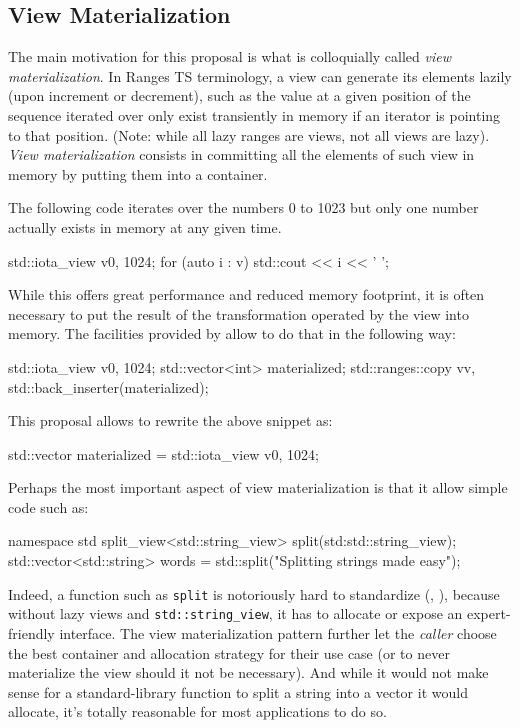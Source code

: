 \documentclass{wg21}
\newcommand{\cc}[1]{\texttt{#1}}
\begin{document}
\subsection{View Materialization}

The main motivation for this proposal is what is colloquially called \emph{view materialization}.
In Ranges TS terminology, a view can generate its elements lazily (upon increment or decrement), such as the value at a given position of the sequence
iterated over only exist transiently in memory if an iterator is pointing to that position.
(Note: while all lazy ranges are views, not all views are lazy).\\

\emph{View materialization} consists in committing all the elements of such view in memory by putting them into a container.

The following code iterates over the numbers 0 to 1023 but only one number actually exists in memory at any given time. 
\begin{codeblock}
std::iota_view v{0, 1024};
for (auto i : v) {
	std::cout << i << ' ';
}
\end{codeblock}

While this offers great performance and reduced memory footprint, it is often necessary to put the result of the transformation operated by the view into memory.
The facilities provided by \cite{P0896R3} allow to do that in the following way:


\begin{codeblock}
	std::iota_view v{0, 1024};
	std::vector<int> materialized;
	std::ranges::copy v{v, std::back_inserter(materialized)};
\end{codeblock}

This proposal allows to rewrite the above snippet as:

\begin{codeblock}
	std::vector materialized = std::iota_view v{0, 1024}; 
\end{codeblock}


Perhaps the most important aspect of view materialization is that it allow simple code such as:

\begin{codeblock}
	namespace std {
		split_view<std::string_view> split(std:std::string_view);
	}
	std::vector<std::string> words = std::split("Splitting strings made easy");
\end{codeblock}

Indeed, a function such as \cc{split} is notoriously hard to standardize (\cite{P0540},  \cite{N3593}), because without lazy views and \cc{std::string_view}, it has to allocate or expose an expert-friendly interface.
The view materialization pattern further let the \emph{caller} choose the best container and allocation strategy for their use case (or to never materialize the view should it not be necessary).
And while it would not make sense for a standard-library function to split a string into a vector it would allocate, it's totally reasonable for most applications to do so.\\
\end{document}
